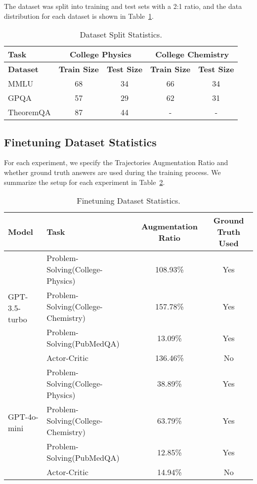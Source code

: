 The dataset was split into training and test sets with a 2:1 ratio, and the data distribution for each dataset is shown in Table~\ref{tab:dataset_split}.
\begin{table}[htbp]
\centering
\caption{Dataset Split Statistics.}
\begin{tabular}{l|cc|cc}
\toprule
\textbf{Task}          &\multicolumn{2}{c|}{College Physics}  &\multicolumn{2}{c}{College Chemistry}   \\ \midrule
\textbf{Dataset} & \textbf{Train Size} & \textbf{Test Size}& \textbf{Train Size} &\textbf{Test Size} \\ \midrule
MMLU             &         68          &          34         &         66           &    34        \\
GPQA             &         57          &          29         &         62           &    31        \\ 
TheoremQA        &         87          &          44         &          -           &     -       \\ 
\bottomrule
\end{tabular}

\label{tab:dataset_split}
\end{table}
\subsection{Finetuning Dataset Statistics}
For each experiment, we specify the Trajectories Augmentation Ratio and whether ground truth answers are used during the training process.
We summarize the setup for each experiment in Table~\ref{tab:problem-solving}.
\begin{table}[htbp]
\centering
\caption{Finetuning Dataset Statistics.}
\label{tab:problem-solving}
\begin{tabular}{l|l|cc}
\toprule
\textbf{Model   }              & \textbf{Task} &\textbf{Augmentation Ratio} & \textbf{Ground Truth Used} \\ \midrule

\multirow{4}{*}{GPT-3.5-turbo} & Problem-Solving(College-Physics)  & 108.93\% & Yes\\ 
                               & Problem-Solving(College-Chemistry)& 157.78\% & Yes  \\ 
                               & Problem-Solving(PubMedQA)         & 13.09\%  & Yes   \\ 
                               & Actor-Critic                      & 136.46\%  & No    \\ 
\midrule
\multirow{4}{*}{GPT-4o-mini}   & Problem-Solving(College-Physics)  & 38.89\%  & Yes    \\ 
                               & Problem-Solving(College-Chemistry)& 63.79\%  & Yes   \\ 
                               & Problem-Solving(PubMedQA)         & 12.85\%  & Yes    \\
                               & Actor-Critic                      & 14.94\%  & No      \\ 
\bottomrule
\end{tabular}
\end{table}


